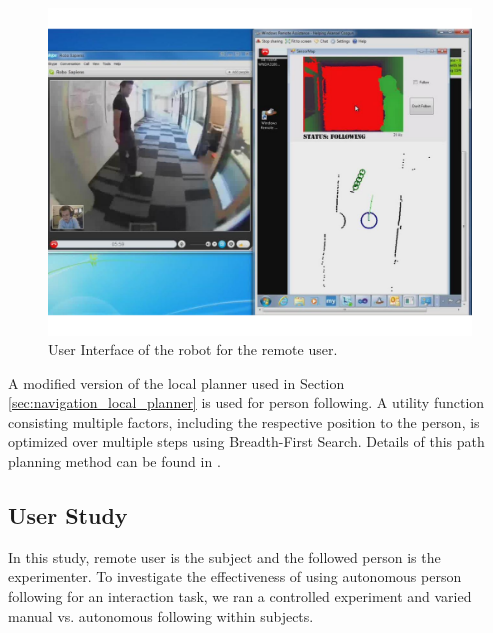 \begin{figure}[h!]
\centering
\includegraphics[width=1.0\textwidth]{pics/telepresence_ui_cropped}
\caption{User Interface of the robot for the remote user.}
\label{fig:telepresence_ui}
\end{figure}

A modified version of the local planner used in Section \ref{sec:navigation_local_planner} is used for person following. A utility function consisting multiple factors, including the respective position to the person, is optimized over multiple steps using Breadth-First Search. Details of this path planning method can be found in \cite{cosgun2013autonomous}.

\subsection{User Study}

In this study, remote user is the subject and the followed person is the experimenter. To investigate the effectiveness of using autonomous person following for an interaction task, we ran a controlled experiment and varied manual vs. autonomous following within subjects.

